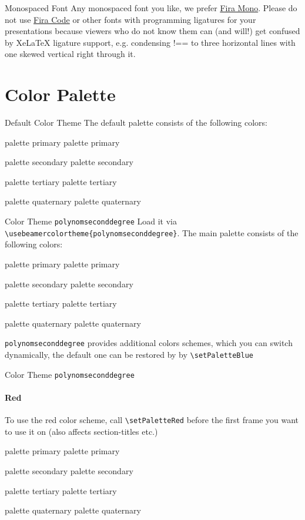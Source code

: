 \documentclass[fragile=singleslide]{beamer}
\begin{document}
\begin{frame}{Monospaced Font}
  Any monospaced font you like, we prefer
  \href{https://mozilla.github.io/Fira/}{Fira Mono}. Please do not use
  \href{https://github.com/tonsky/FiraCode}{Fira Code} or other fonts with 
  programming ligatures for your presentations because viewers who do not 
  know them can (and will!) get confused by XeLaTeX ligature support, e.g.
  condensing !== to three horizontal lines with one skewed vertical right 
  through it.
\end{frame}
 
\section{Color Palette}

\newcommand{\clrbx}[1]{
  \begin{beamercolorbox}[wd=5em,ht=5ex,dp=1.125ex,center]{#1}
    \small#1
  \end{beamercolorbox}}
\newcommand{\paletteColors}{
  \clrbx{palette primary}
  \clrbx{palette secondary}
  \clrbx{palette tertiary}
  \clrbx{palette quaternary}}


\begin{frame}{Default Color Theme}
  The default palette consists of the following colors:\\
  \paletteColors
\end{frame}



\begin{frame}[fragile=singleslide]{Color Theme \texttt{polynomseconddegree}}
  Load it via \verb|\usebeamercolortheme{polynomseconddegree}|. 
  The main palette consists of the following colors:\\
  \paletteColors
  
  \texttt{polynomseconddegree} provides additional colors schemes,
  which you can switch dynamically, the default one can be restored by by
  \verb|\setPaletteBlue|
\end{frame}

\setPaletteRed
\begin{frame}[fragile=singleslide]{Color Theme \texttt{polynomseconddegree}}
  \framesubtitle{Red}

  To use the red color scheme, call \verb|\setPaletteRed|
  before the first frame you want to use it on (also affects
  section-titles etc.)\\
  \paletteColors
  
\end{frame}
\end{document}
